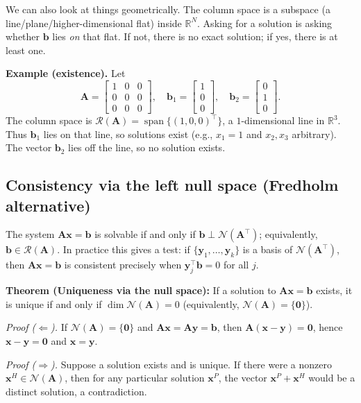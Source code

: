 We can also look at things geometrically. The column space is a subspace (a line/plane/higher-dimensional flat) inside $\mathbb{R}^N$. Asking for a solution is asking whether $\mathbf{b}$ lies \emph{on} that flat. If not, there is no exact solution; if yes, there is at least one.

\begin{exampleBox}
\textbf{Example (existence).} Let
\[
\mathbf{A}=\begin{bmatrix}1&0&0\\ 0&0&0\\ 0&0&0\end{bmatrix},\quad
\mathbf{b}_1=\begin{bmatrix}1\\0\\0\end{bmatrix},\quad
\mathbf{b}_2=\begin{bmatrix}0\\1\\0\end{bmatrix}.
\]
The column space is $\mathcal{R}(\mathbf{A})=\operatorname{span}\{(1,0,0)^{\top}\}$, a $1$-dimensional line in $\mathbb{R}^3$. Thus $\mathbf{b}_1$ lies on that line, so solutions exist (e.g., $x_1=1$ and $x_2,x_3$ arbitrary). The vector $\mathbf{b}_2$ lies off the line, so no solution exists.
\end{exampleBox}

\subsection{Consistency via the left null space (Fredholm alternative)}
The system $\mathbf{A}\mathbf{x}=\mathbf{b}$ is solvable if and only if $\mathbf{b}\perp \mathcal{N}(\mathbf{A}^{\top})$; equivalently, $\mathbf{b}\in\mathcal{R}(\mathbf{A})$. In practice this gives a test: if $\{\mathbf{y}_1,\dots,\mathbf{y}_k\}$ is a basis of $\mathcal{N}(\mathbf{A}^{\top})$, then $\mathbf{A}\mathbf{x}=\mathbf{b}$ is consistent precisely when $\mathbf{y}_j^{\top}\mathbf{b}=0$ for all $j$.

\begin{theoremBox}
\textbf{Theorem (Uniqueness via the null space):} If a solution to $\mathbf{A}\mathbf{x}=\mathbf{b}$ exists, it is unique if and only if $\dim\mathcal{N}(\mathbf{A})=0$ (equivalently, $\mathcal{N}(\mathbf{A})=\{\mathbf{0}\}$).

\textit{Proof ($\Leftarrow$).}\; If $\mathcal{N}(\mathbf{A})=\{\mathbf{0}\}$ and $\mathbf{A}\mathbf{x}=\mathbf{A}\mathbf{y}=\mathbf{b}$, then $\mathbf{A}(\mathbf{x}-\mathbf{y})=\mathbf{0}$, hence $\mathbf{x}-\mathbf{y}=\mathbf{0}$ and $\mathbf{x}=\mathbf{y}$.

\textit{Proof ($\Rightarrow$).}\; Suppose a solution exists and is unique. If there were a nonzero $\mathbf{x}^{H}\in\mathcal{N}(\mathbf{A})$, then for any particular solution $\mathbf{x}^{P}$, the vector $\mathbf{x}^{P}+\mathbf{x}^{H}$ would be a distinct solution, a contradiction.
\end{theoremBox}

